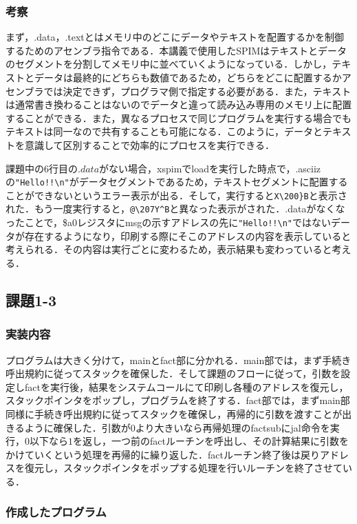 \documentclass[a4j,11pt]{jarticle}
\begin{document}
  \subsubsection{考察}
  まず，.data，.textとはメモリ中のどこにデータやテキストを配置するかを制御するためのアセンブラ指令である．本講義で使用したSPIMはテキストとデータのセグメントを分割してメモリ中に並べていくようになっている．しかし，テキストとデータは最終的にどちらも数値であるため，どちらをどこに配置するかアセンブラでは決定できず，プログラマ側で指定する必要がある．また，テキストは通常書き換わることはないのでデータと違って読み込み専用のメモリ上に配置することができる．また，異なるプロセスで同じプログラムを実行する場合でもテキストは同一なので共有することも可能になる．このように，データとテキストを意識して区別することで効率的にプロセスを実行できる．

  課題中の6行目の$.data$がない場合，xspimでloadを実行した時点で，.asciizの\verb|"Hello!!\n"|がデータセグメントであるため，テキストセグメントに配置することができないというエラー表示が出る．そして，実行すると\verb|X\200}B|と表示された．もう一度実行すると，\verb|@\207Y^B|と異なった表示がされた．.dataがなくなったことで，\$a0レジスタにmsgの示すアドレスの先に\verb|"Hello!!\n"|ではないデータが存在するようになり，印刷する際にそこのアドレスの内容を表示していると考えられる．その内容は実行ごとに変わるため，表示結果も変わっていると考える．
 \subsection{課題1-3}
  \subsubsection{実装内容}
  プログラムは大きく分けて，mainとfact部に分かれる．main部では，まず手続き呼出規約に従ってスタックを確保した．そして課題のフローに従って，引数を設定しfactを実行後，結果をシステムコールにて印刷し各種のアドレスを復元し，スタックポインタをポップし，プログラムを終了する．fact部では，まずmain部同様に手続き呼出規約に従ってスタックを確保し，再帰的に引数を渡すことが出きるように確保した．引数が$0$より大きいなら再帰処理のfactsubにjal命令を実行，$0$以下なら$1$を返し，一つ前のfactルーチンを呼出し、その計算結果に引数をかけていくという処理を再帰的に繰り返した．factルーチン終了後は戻りアドレスを復元し，スタックポインタをポップする処理を行いルーチンを終了させている．

  \subsubsection{作成したプログラム}
  
\end{document}
